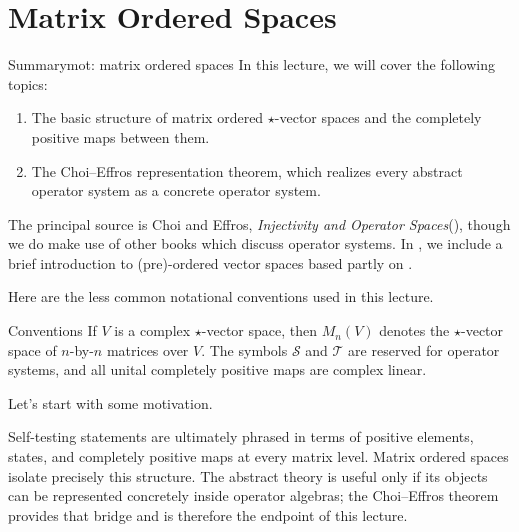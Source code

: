 \documentclass[main.tex]{subfiles}
\begin{document}
\newpage
\section{Matrix Ordered Spaces}
\label{sec:matrix-ordered-spaces}

\begin{motivation}{\large Summary}{mot: matrix ordered spaces}
In this lecture, we will cover the following topics:
\begin{enumerate}
    \item The basic structure of matrix ordered $\star$-vector spaces and the
    completely positive maps between them.
    \item The Choi--Effros representation theorem, which realizes every
    abstract operator system as a concrete operator system.
\end{enumerate}
The principal source is Choi and Effros,
\emph{Injectivity and Operator Spaces}(\cite{choi-effros-injectivity-1977}), though we do make use of other books which discuss operator systems. In , we include a brief introduction to (pre)-ordered vector spaces based partly on \cite{jameson1970ordered}. 
\end{motivation}

Here are the less common notational conventions used in this lecture.

\begin{filingbox}[NavyBlue]{Conventions}
If $V$ is a complex $\star$-vector space, then $M_n(V)$ denotes the
$\star$-vector space of $n$-by-$n$ matrices over $V$.  The symbols
$\mathcal S$ and $\mathcal T$ are reserved for operator systems, and all
unital completely positive maps are complex linear.
\end{filingbox}

\newpage

Let's start with some motivation.

\begin{motiv}
Self-testing statements are ultimately phrased in terms of positive elements,
states, and completely positive maps at every matrix level.  Matrix ordered
spaces isolate precisely this structure.  The abstract theory is useful only
if its objects can be represented concretely inside operator algebras; the
Choi--Effros theorem provides that bridge and is therefore the endpoint of
this lecture.
\end{motiv}
\end{document}
